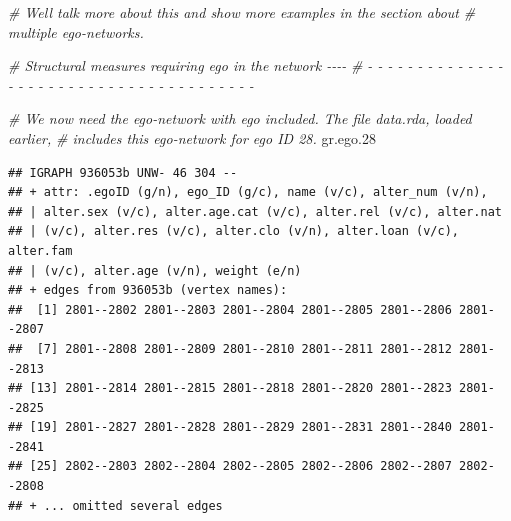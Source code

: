 \documentclass[
]{book}
\newenvironment{Shaded}{\begin{snugshade}}{\end{snugshade}}
\newcommand{\AttributeTok}[1]{\textcolor[rgb]{0.13,0.29,0.53}{#1}}
\newcommand{\CommentTok}[1]{\textcolor[rgb]{0.56,0.35,0.01}{\textit{#1}}}
\newcommand{\ConstantTok}[1]{\textcolor[rgb]{0.56,0.35,0.01}{#1}}
\newcommand{\FloatTok}[1]{\textcolor[rgb]{0.00,0.00,0.81}{#1}}
\newcommand{\FunctionTok}[1]{\textcolor[rgb]{0.13,0.29,0.53}{\textbf{#1}}}
\newcommand{\NormalTok}[1]{#1}
\newcommand{\OtherTok}[1]{\textcolor[rgb]{0.56,0.35,0.01}{#1}}
\newcommand{\StringTok}[1]{\textcolor[rgb]{0.31,0.60,0.02}{#1}}
\begin{document}
\begin{Shaded}
\begin{Highlighting}[]
\CommentTok{\# We\textquotesingle{}ll talk more about this and show more examples in the section about }
\CommentTok{\# multiple ego{-}networks.}

\CommentTok{\# Structural measures requiring ego in the network                          {-}{-}{-}{-}}
\CommentTok{\# {-} {-} {-} {-} {-} {-} {-} {-} {-} {-} {-} {-} {-} {-} {-} {-} {-} {-} {-} {-} {-} {-} {-} {-} {-} {-} {-} {-} {-} {-} {-} {-} {-} {-} {-} {-} {-} {-} {-} }

\CommentTok{\# We now need the ego{-}network with ego included. The file data.rda, loaded earlier,}
\CommentTok{\# includes this ego{-}network for ego ID 28. }
\NormalTok{gr.ego}\FloatTok{.28}
\end{Highlighting}
\end{Shaded}

\begin{verbatim}
## IGRAPH 936053b UNW- 46 304 -- 
## + attr: .egoID (g/n), ego_ID (g/c), name (v/c), alter_num (v/n),
## | alter.sex (v/c), alter.age.cat (v/c), alter.rel (v/c), alter.nat
## | (v/c), alter.res (v/c), alter.clo (v/n), alter.loan (v/c), alter.fam
## | (v/c), alter.age (v/n), weight (e/n)
## + edges from 936053b (vertex names):
##  [1] 2801--2802 2801--2803 2801--2804 2801--2805 2801--2806 2801--2807
##  [7] 2801--2808 2801--2809 2801--2810 2801--2811 2801--2812 2801--2813
## [13] 2801--2814 2801--2815 2801--2818 2801--2820 2801--2823 2801--2825
## [19] 2801--2827 2801--2828 2801--2829 2801--2831 2801--2840 2801--2841
## [25] 2802--2803 2802--2804 2802--2805 2802--2806 2802--2807 2802--2808
## + ... omitted several edges
\end{verbatim}

\begin{Shaded}
\end{Shaded}
\end{document}
